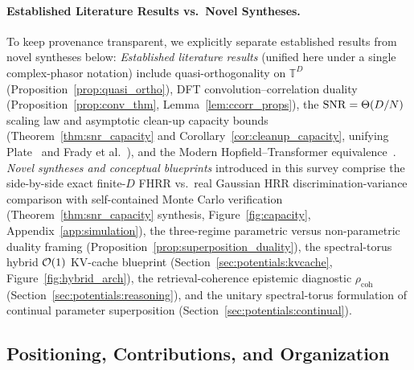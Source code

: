 \paragraph{Established Literature Results vs.\ Novel Syntheses.}
To keep provenance transparent, we explicitly separate established results from novel syntheses below:
\emph{Established literature results} (unified here under a single complex-phasor notation) include quasi-orthogonality on $\mathbb{T}^D$ (Proposition~\ref{prop:quasi_ortho}), DFT convolution--correlation duality (Proposition~\ref{prop:conv_thm}, Lemma~\ref{lem:ccorr_props}), the $\mathrm{SNR} = \Theta(D/N)$ scaling law and asymptotic clean-up capacity bounds (Theorem~\ref{thm:snr_capacity} and Corollary~\ref{cor:cleanup_capacity}, unifying Plate~\cite{PLATE_1995_HRR} and Frady et al.~\cite{FRADY_CAPACITY_VSA}), and the Modern Hopfield--Transformer equivalence~\cite{RAMSAUER_MODERN_HOPFIELD}.
\emph{Novel syntheses and conceptual blueprints} introduced in this survey comprise the side-by-side exact finite-$D$ FHRR vs.\ real Gaussian HRR discrimination-variance comparison with self-contained Monte Carlo verification (Theorem~\ref{thm:snr_capacity} synthesis, Figure~\ref{fig:capacity}, Appendix~\ref{app:simulation}), the three-regime parametric versus non-parametric duality framing (Proposition~\ref{prop:superposition_duality}), the spectral-torus hybrid $\mathcal{O}\!\left(1\right)$ KV-cache blueprint (Section~\ref{sec:potentials:kvcache}, Figure~\ref{fig:hybrid_arch}), the retrieval-coherence epistemic diagnostic $\rho_{\mathrm{coh}}$ (Section~\ref{sec:potentials:reasoning}), and the unitary spectral-torus formulation of continual parameter superposition (Section~\ref{sec:potentials:continual}).

\subsection{Positioning, Contributions, and Organization}\label{sec:intro:contributions}

